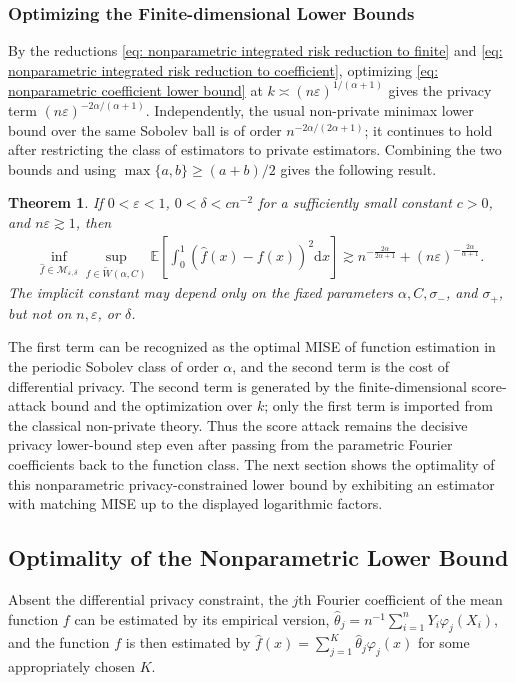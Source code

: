 \documentclass[letterpaper,12pt]{article}
\renewcommand{\d}{\mathrm{d}}
\numberwithin{equation}{section}
\theoremstyle{plain}
\newtheorem{Theorem}{Theorem}
\numberwithin{Theorem}{section}
\numberwithin{proposition}{section}
\numberwithin{Lemma}{section}
{
	\theoremstyle{definition}
	\newtheorem{Definition}{Definition}
	\newtheorem{example}{Example}
	\numberwithin{example}{section}
	\newtheorem{fact}{Fact}
	\numberwithin{fact}{section}
	\newtheorem{remark}{Remark}
}
\newcommand{\rev}[1]{#1}
\newcommand{\furtherrev}[1]{#1}
\newcommand{\1}{\mathbbm{1}}
\def\E{\mathbb{E}}
\begin{document}
	\subsubsection{Optimizing the Finite-dimensional Lower Bounds}
	{By the reductions \eqref{eq: nonparametric integrated risk reduction to finite} and \eqref{eq: nonparametric integrated risk reduction to coefficient}, optimizing \eqref{eq: nonparametric coefficient lower bound} at $k\asymp(n\varepsilon)^{1/(\alpha+1)}$ gives the privacy term $(n\varepsilon)^{-2\alpha/(\alpha+1)}$. Independently, the usual non-private minimax lower bound over the same Sobolev ball is of order $n^{-2\alpha/(2\alpha+1)}$; it continues to hold after restricting the class of estimators to private estimators. Combining the two bounds and using $\max\{a,b\}\geq(a+b)/2$ gives the following result.}
	
	\begin{Theorem}\label{thm: nonparametric integrated risk lower bound}
			If $0 < \varepsilon < 1$, $0 < \delta < cn^{-2}$ for a sufficiently small constant $c > 0$, and $n\varepsilon \gtrsim 1$, then
		\begin{align}\label{eq: nonparametric integrated risk lower bound}
		\inf_{\hat f \in \mathcal M_{\varepsilon, \delta}} \sup_{f \in \tilde W(\alpha, C)} \E\left[\int_0^1 (\hat f(x)-f(x))^2 \d x\right] \gtrsim n^{-\frac{2\alpha}{2\alpha+1}} + (n\varepsilon)^{-\frac{2\alpha}{\alpha+1}}.
	\end{align}
	\furtherrev{The implicit constant may depend only on the fixed parameters $\alpha,C,\sigma_-$, and $\sigma_+$, but not on $n,\varepsilon$, or $\delta$.}
\end{Theorem}
		The first term can be recognized as the optimal MISE of function estimation in the periodic Sobolev class of order $\alpha$, and the second term is the cost of differential privacy. \rev{The second term is generated by the finite-dimensional score-attack bound and the optimization over $k$; only the first term is imported from the classical non-private theory. Thus the score attack remains the decisive privacy lower-bound step even after passing from the parametric Fourier coefficients back to the function class.} The next section shows the optimality of this \furtherrev{nonparametric} privacy-constrained lower bound by exhibiting an estimator with matching MISE up to the displayed logarithmic factors.
	
	\subsection{Optimality of the \texorpdfstring{\furtherrev{Nonparametric}}{Nonparametric} Lower Bound}\label{sec: nonparametric upper bound}
	Absent the differential privacy constraint, the $j$th Fourier coefficient of the mean function $f$ can be estimated by its empirical version, $\hat\theta_j = n^{-1}\sum_{i=1}^n Y_i\varphi_j(X_i)$, and the function $f$ is then estimated by $\hat f(x) = \sum_{j=1}^K \hat\theta_j \varphi_j(x)$ for some appropriately chosen $K$.
	
\end{document}
